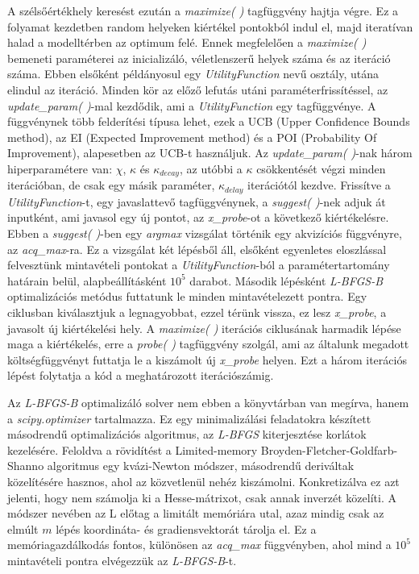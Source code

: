 		A szélsőértékhely keresést ezután a \textit{maximize( )} tagfüggvény hajtja végre. Ez a folyamat kezdetben random helyeken kiértékel pontokból indul el, majd iteratívan halad a modelltérben az optimum felé. Ennek megfelelően a \textit{maximize( )} bemeneti paraméterei az inicializáló, véletlenszerű helyek száma és az iteráció száma. Ebben elsőként példányosul egy \textit{UtilityFunction} nevű osztály, utána elindul az iteráció. 
		Minden kör az előző lefutás utáni paraméterfrissítéssel, az \textit{update\_param( )}-mal kezdődik, ami a \textit{UtilityFunction} egy tagfüggvénye. A függvénynek több felderítési típusa lehet, ezek a UCB (Upper Confidence Bounds method), az EI (Expected Improvement method) és a POI (Probability Of Improvement), alapesetben az UCB-t használjuk. Az \textit{update\_param( )}-nak három hiperparamétere van: $\chi$, $\kappa$ és $\kappa_{decay}$, az utóbbi a $\kappa$ csökkentését végzi minden iterációban, de csak egy másik paraméter, $\kappa_{delay}$ iterációtól kezdve.
		Frissítve a \textit{UtilityFunction}-t, egy javaslattevő tagfüggvénynek, a \textit{suggest( )}-nek adjuk át inputként, ami javasol egy új pontot, az \textit{x\_probe}-ot a következő kiértékelésre. Ebben a \textit{suggest( )}-ben egy \textit{argmax} vizsgálat történik egy akvizíciós függvényre, az \textit{acq\_max}-ra. Ez a vizsgálat két lépésből áll, elsőként egyenletes eloszlással felvesztünk mintavételi pontokat a \textit{UtilityFunction}-ból a paramétertartomány határain belül, alapbeállításként $10^{5}$ darabot. Második lépésként \textit{L-BFGS-B} optimalizációs metódus futtatunk le minden mintavételezett pontra. Egy ciklusban kiválasztjuk a legnagyobbat, ezzel térünk vissza, ez lesz \textit{x\_probe}, a javasolt új kiértékelési hely.
		A \textit{maximize( )} iterációs ciklusának harmadik lépése maga a kiértékelés, erre a \textit{probe( )} tagfüggvény szolgál, ami az általunk megadott költségfüggvényt futtatja le a kiszámolt új \textit{x\_probe} helyen. Ezt a három iterációs lépést folytatja a kód a meghatározott iterációszámig.
	
		Az \textit{L-BFGS-B} optimalizáló solver nem ebben a könyvtárban van megírva, hanem a \textit{scipy.optimizer} tartalmazza. Ez egy minimalizálási feladatokra készített másodrendű optimalizációs algoritmus, az \textit{L-BFGS} kiterjesztése korlátok kezelésére. Feloldva a rövidítést a Limited-memory Broyden-Fletcher-Goldfarb-Shanno algoritmus egy kvázi-Newton módszer, másodrendű deriváltak közelítésére hasznos, ahol az közvetlenül nehéz kiszámolni. Konkretizálva ez azt jelenti, hogy nem számolja ki a Hesse-mátrixot, csak annak inverzét közelíti. A módszer nevében az L előtag a limitált memóriára utal, azaz mindig csak az elmúlt $m$ lépés koordináta- és gradiensvektorát tárolja el. Ez a memóriagazdálkodás fontos, különösen az \textit{acq\_max} függvényben, ahol mind a $10^{5}$ mintavételi pontra elvégezzük az \textit{L-BFGS-B}-t.
	
